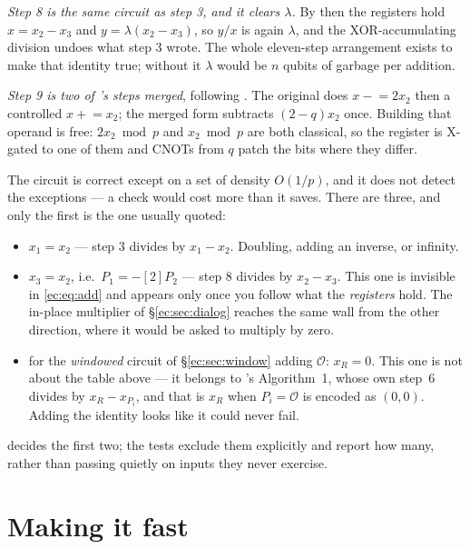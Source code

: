 \emph{Step 8 is the same circuit as step 3, and it \emph{clears} $\lambda$.} By then the registers
hold $x=x_2-x_3$ and $y=\lambda(x_2-x_3)$, so $y/x$ is again $\lambda$, and the XOR-accumulating
division undoes what step 3 wrote. The whole eleven-step arrangement exists to make that identity
true; without it $\lambda$ would be $n$ qubits of garbage per addition.

\emph{Step 9 is two of \cite{ec:hjnrs20}'s steps merged}, following \cite{ec:kim26}. The original
does $x\mathrel{-}=2x_2$ then a controlled $x\mathrel{+}=x_2$; the merged form subtracts
$(2-q)x_2$ once. Building that operand is free: $2x_2\bmod p$ and $x_2\bmod p$ are both classical,
so the register is X-gated to one of them and CNOTs from $q$ patch the bits where they differ.

\begin{warnbox}[title={Three exceptional cases, not one}]
The circuit is correct except on a set of density $O(1/p)$, and it does not detect the exceptions
--- a check would cost more than it saves. There are three, and only the first is the one usually
quoted:
\begin{itemize}\setlength\itemsep{1pt}
\item $x_1=x_2$ --- step 3 divides by $x_1-x_2$. Doubling, adding an inverse, or infinity.
\item $x_3=x_2$, i.e.\ $P_1=-[2]P_2$ --- step 8 divides by $x_2-x_3$. This one is invisible in
\eqref{ec:eq:add} and appears only once you follow what the \emph{registers} hold. The in-place
multiplier of \S\ref{ec:sec:dialog} reaches the same wall from the other direction, where it would
be asked to multiply by zero.
\item for the \emph{windowed} circuit of \S\ref{ec:sec:window} adding $\mathcal O$: $x_R=0$. This
one is not about the table above --- it belongs to \cite{ec:schrott26}'s Algorithm~1, whose own
step~6 divides by $x_R-x_{P_i}$, and that is $x_R$ when $P_i=\mathcal O$ is encoded as $(0,0)$.
Adding the identity looks like it could never fail.
\end{itemize}
 decides the first two; the tests exclude them
explicitly and report how many, rather than passing quietly on inputs they never exercise.
\end{warnbox}

\section{Making it fast}\label{ec:sec:fast}

